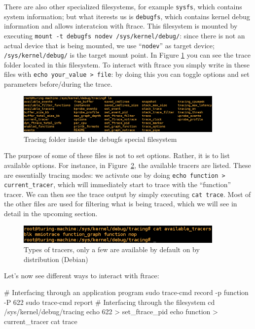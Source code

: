 There are also other specialized filesystems, for example \verb|sysfs|, which contains system information; but what iterests us is \verb|debugfs|, which contains kernel debug information and allows interatcion  with ftrace. This filesystem is mounted by executing \verb|mount -t debugfs nodev /sys/kernel/debug/|: since there is not an actual device that is being mounted, we use ``\verb|nodev|'' as target device; \verb|/sys/kernel/debug/| is the target mount point. In Figure \ref{img:tracing} you can see the trace folder located in this filesystem. To interact with ftrace you simply write in these files with \verb|echo your_value > file|: by doing this you can toggle options and set parameters before/during the trace. 

\begin{figure}[ht]
\centering
\includegraphics[width=0.9\textwidth]{images/shell_tracing.png} 
\caption{Tracing folder inside the debugfs special filesystem}
\label{img:tracing}
\end{figure}

The purpose of some of these files is not to set options. Rather, it is to list available options. For instance, in Figure~\ref{img:tracers}, the available tracers are listed. These are essentially tracing modes: we activate one by doing \verb|echo function > current_tracer|, which will immediately start to trace with the ``function'' tracer. We can then see the trace output by simply executing \verb|cat trace|. Most of the other files are used for filtering what is being traced, which we will see in detail in the upcoming section.

\begin{figure}[ht]
\centering
\includegraphics[width=0.9\textwidth]{images/shell_tracers.png} 
\caption{Types of tracers, only a few are available by default on by distribution (Debian)}
\label{img:tracers}
\end{figure}

\newpage %
Let's now see different ways to interact with ftrace:
\begin{codebash}
# Interfacing through an application program
sudo trace-cmd record -p function -P 622
sudo trace-cmd report
# Interfacing through the filesystem
cd /sys/kernel/debug/tracing
echo 622 > set_ftrace_pid
echo function > current_tracer
cat trace
\end{codebash}

